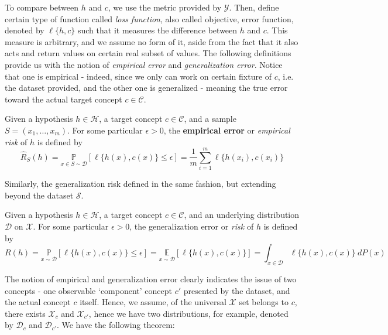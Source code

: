 To compare between $h$ and $c$, we use the metric provided by $\mathcal{Y}$. Then, define certain type of function called \textit{loss function}, also called objective, error function, denoted by $\ell\{h,c\}$ such that it measures the difference between $h$ and $c$. This measure is arbitrary, and we assume no form of it, aside from the fact that it also acts and return values on certain real subset of values. The following definitions provide us with the notion of \textit{empirical error} and \textit{generalization error}. Notice that one is empirical - indeed, since we only can work on certain fixture of $c$, i.e. the dataset provided, and the other one is generalized - meaning the true error toward the actual target concept $c\in\mathcal{C}$. 
\begin{definition}
    Given a hypothesis $h\in \mathcal{H}$, a target concept $c\in \mathcal{C}$, and a sample $S=(x_{1},\dots,x_{m})$. For some particular $\epsilon>0$, the \textbf{empirical error} or \textit{empirical risk} of $h$ is defined by\begin{equation}
        \hat{R}_{S}(h) = \underset{x\in S\sim\mathcal{D}}{\mathbb{P}} [\ell\{h(x),c(x)\}\leq \epsilon] =\frac{1}{m} \sum_{i=1}^{m} \ell\{h(x_i),c(x_i)\}
    \end{equation} 
\end{definition}
 Similarly, the generalization risk defined in the same fashion, but extending beyond the dataset $\mathcal{S}$. 
\begin{definition}
    Given a hypothesis $h\in\mathcal{H}$, a target concept $c\in\mathcal{C}$, and an underlying distribution $\mathcal{D}$ on $\mathcal{X}$. For some particular $\epsilon>0$, the generalization error or \textit{risk} of $h$ is defined by
    \begin{equation}
        R(h) = \underset{x\sim\mathcal{D}}{\mathbb{P}} [\ell\{h(x),c(x)\}\leq \epsilon] = \underset{x\sim\mathcal{D}}{\mathbb{E}}[\ell\{h(x),c(x)\}] = \int_{x\in \mathcal{D}} \ell\{h(x),c(x)\} \: dP(x)
    \end{equation} 
\end{definition}

The notion of empirical and generalization error clearly indicates the issue of two concepts - one observable `component' concept $c'$ presented by the dataset, and the actual concept $c$ itself. Hence, we assume, of the universal $\mathcal{X}$ set belongs to $c$, there exists $\mathcal{X}_{c}$ and $\mathcal{X}_{c'}$, hence we have two distributions, for example, denoted by $\mathcal{D}_{c}$ and $\mathcal{D}_{c'}$. We have the following theorem:

